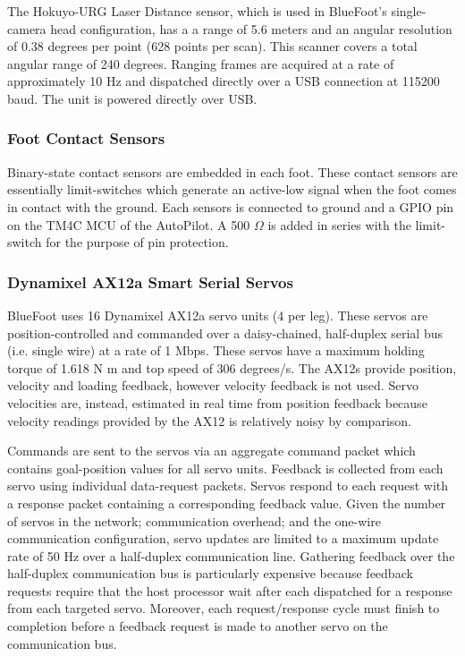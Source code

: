 				The Hokuyo-URG Laser Distance sensor, which is used in BlueFoot's single-camera head configuration, has a a range of 5.6 meters and an angular resolution of 0.38 degrees per point (628 points per scan). This scanner covers a total angular range of 240 degrees. Ranging frames are acquired at a rate of approximately 10 Hz and dispatched directly over a USB connection at 115200 baud. The unit is powered directly over USB.

			\subsubsection{Foot Contact Sensors}

				Binary-state contact sensors are embedded in each foot. These contact sensors are essentially limit-switches which generate an active-low signal when the foot comes in contact with the ground. Each sensors is connected to ground and a GPIO pin on the TM4C MCU of the AutoPilot. A 500 $\Omega$ is added in series with the limit-switch for the purpose of pin protection.

			\subsubsection{Dynamixel AX12a Smart Serial Servos}

				BlueFoot uses 16 Dynamixel AX12a servo units (4 per leg). These servos are position-controlled and commanded over a daisy-chained, half-duplex serial bus (i.e. single wire) at a rate of 1 Mbps. These servos have a maximum holding torque of 1.618 N m and top speed of 306 degrees/s. The AX12s provide position, velocity and loading feedback, however velocity feedback is not used. Servo velocities are, instead, estimated in real time from position feedback because velocity readings provided by the AX12 is relatively noisy by comparison. 

				Commands are sent to the servos via an aggregate command packet which contains goal-position values for all servo units. Feedback is collected from each servo using individual data-request packets. Servos respond to each request with a response packet containing a corresponding feedback value. Given the number of servos in the network; communication overhead; and the one-wire communication configuration, servo updates are limited to a maximum update rate of 50 Hz over a half-duplex communication line. Gathering feedback over the half-duplex communication bus is particularly expensive because feedback requests require that the host processor wait after each dispatched for a response from each targeted servo. Moreover, each request/response cycle must finish to completion before a feedback request is made to another servo on the communication bus.

